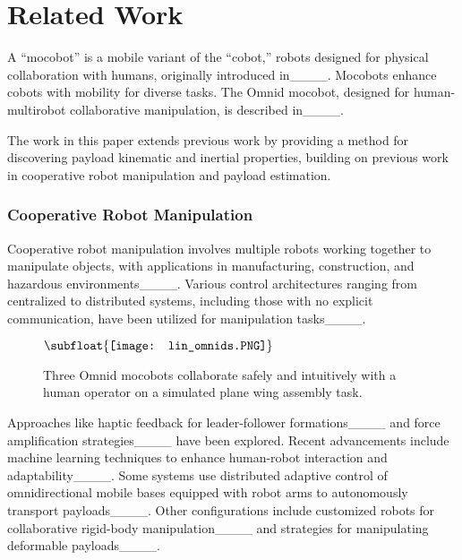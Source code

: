 \section{Related Work}
A ``mocobot'' is a mobile variant of the ``cobot,'' robots designed for physical collaboration with humans, originally introduced in____. Mocobots enhance cobots with mobility for diverse tasks. The Omnid mocobot, designed for human-multirobot collaborative manipulation, is described in____. 

The work in this paper extends previous work by providing a method for discovering payload kinematic and inertial properties, building on previous work in cooperative robot manipulation and payload estimation.
\subsubsection{Cooperative Robot Manipulation}
Cooperative robot manipulation involves multiple robots working together to manipulate objects, with applications in manufacturing, construction, and hazardous environments____. Various control architectures ranging from centralized to distributed systems, including those with no explicit communication, have been utilized for manipulation tasks____.

\begin{figure} 
\centering
$\vcenter{\hbox{\subfloat{\texttt{[image: lin\_omnids.PNG]}}}}$
\caption{Three Omnid mocobots collaborate safely and intuitively with a human operator on a simulated plane wing assembly task.}
\label{fig:demo}
\end{figure}

Approaches like haptic feedback for leader-follower formations____ and force amplification strategies____ have been explored. Recent advancements include machine learning techniques to enhance human-robot interaction and adaptability____. Some systems use distributed adaptive control of omnidirectional mobile bases equipped with robot arms to autonomously transport payloads____. Other configurations include customized robots for collaborative rigid-body manipulation____ and strategies for manipulating deformable payloads____. 

